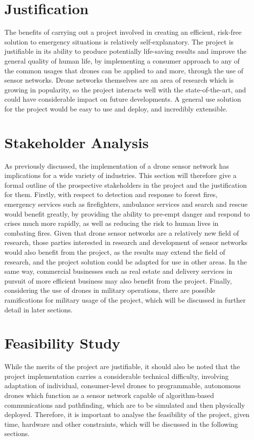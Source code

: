 \documentclass[12pt,a4paper,twoside]{report}
\begin{document}
	\section{Justification}
	The benefits of carrying out a project involved in creating an efficient, risk-free solution to emergency situations is relatively self-explanatory. The project is justifiable in its ability to produce potentially life-saving results and improve the general quality of human life, by implementing a consumer approach to any of the common usages that drones can be applied to and more, through the use of sensor networks. Drone networks themselves are an area of research which is growing in popularity, so the project interacts well with the state-of-the-art, and could have considerable impact on future developments. A general use solution for the project would be easy to use and deploy, and incredibly extensible.
	\section{Stakeholder Analysis}
	As previously discussed, the implementation of a drone sensor network has implications for a wide variety of industries. This section will therefore give a formal outline of the prospective stakeholders in the project and the justification for them. Firstly, with respect to detection and response to forest fires, emergency services such as firefighters, ambulance services and search and rescue would benefit greatly, by providing the ability to pre-empt danger and respond to crises much more rapidly, as well as reducing the risk to human lives in combating fires. Given that drone sensor networks are a relatively new field of research, those parties interested in research and development of sensor networks would also benefit from the project, as the results may extend the field of research, and the project solution could be adapted for use in other areas. In the same way, commercial businesses such as real estate and delivery services in pursuit of more efficient business may also benefit from the project. Finally, considering the use of drones in military operations, there are possible ramifications for military usage of the project, which will be discussed in further detail in later sections.
	\section{Feasibility Study}
	While the merits of the project are justifiable, it should also be noted that the project implementation carries a considerable technical difficulty, involving adaptation of individual, consumer-level drones to programmable, autonomous drones which function as a sensor network capable of algorithm-based communications and pathfinding, which are to be simulated and then physically deployed. Therefore, it is important to analyse the feasibility of the project, given time, hardware and other constraints, which will be discussed in the following sections.
\end{document}
